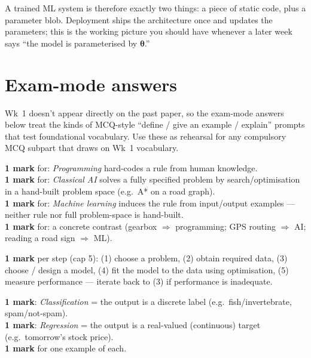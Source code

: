 \documentclass[11pt, a4paper]{article}
\begin{document}
A trained ML system is therefore exactly two things: a piece of static code, plus a parameter blob. Deployment ships the architecture once and updates the parameters; this is the working picture you should have whenever a later week says ``the model is parameterised by $\boldsymbol\theta$.''

\section*{Exam-mode answers}

Wk~1 doesn't appear directly on the past paper, so the exam-mode answers below treat the kinds of MCQ-style ``define / give an example / explain'' prompts that test foundational vocabulary. Use these as rehearsal for any compulsory MCQ subpart that draws on Wk~1 vocabulary.

\begin{exambox}
\textbf{1 mark} for: \emph{Programming} hard-codes a rule from human knowledge. \\
\textbf{1 mark} for: \emph{Classical AI} solves a fully specified problem by search/optimisation in a hand-built problem space (e.g.\ A* on a road graph). \\
\textbf{1 mark} for: \emph{Machine learning} induces the rule from input/output examples — neither rule nor full problem-space is hand-built. \\
\textbf{1 mark} for: a concrete contrast (gearbox $\Rightarrow$ programming; GPS routing $\Rightarrow$ AI; reading a road sign $\Rightarrow$ ML).
\end{exambox}

\begin{exambox}
\textbf{1 mark} per step (cap 5): (1) choose a problem, (2) obtain required data, (3) choose / design a model, (4) fit the model to the data using optimisation, (5) measure performance — iterate back to (3) if performance is inadequate.
\end{exambox}

\begin{exambox}
\textbf{1 mark}: \emph{Classification} = the output is a discrete label (e.g.\ fish/invertebrate, spam/not-spam). \\
\textbf{1 mark}: \emph{Regression} = the output is a real-valued (continuous) target (e.g.\ tomorrow's stock price). \\
\textbf{1 mark} for one example of each.
\end{exambox}
\end{document}
